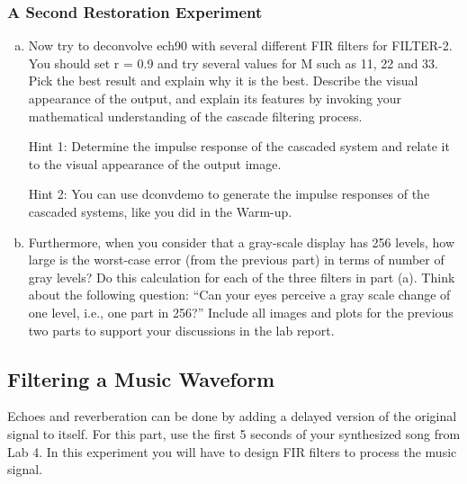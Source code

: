 \subsubsection{A Second Restoration Experiment}
\begin{enumerate}[a)]
	\item Now try to deconvolve ech90 with several different FIR filters for FILTER-2. You should set r = 0.9 and try several values for M such as 11, 22 and 33. Pick the best result and explain why it is the best.
	Describe the visual appearance of the output, and explain its features by invoking your mathematical
	understanding of the cascade filtering process. 
	
	Hint 1: Determine the impulse response of the cascaded
	system and relate it to the visual appearance of the output image.
	
	Hint 2: You can use dconvdemo to generate the impulse responses of the cascaded systems, like you
	did in the Warm-up.
	
\item Furthermore, when you consider that a gray-scale display has 256 levels, how large is the worst-case error (from the previous part) in terms of number of gray levels? Do this calculation for each of the 	three filters in part (a). 
	Think about the following question: “Can your eyes perceive a gray scale change of one level, i.e., one part in 256?”
	Include all images and plots for the previous two parts to support your discussions in the lab report.
\end{enumerate}

\subsection{Filtering a Music Waveform}
Echoes and reverberation can be done by adding a delayed version of the original signal to itself. For this part, use the first 5 seconds of your synthesized song from Lab 4. In this experiment you will have to design FIR filters to process the music signal.

